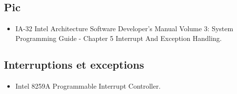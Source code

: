\documentclass[10pt,a4wide]{article}
\begin{document}
\subsection{Pic}

\paragraph{}

\begin{itemize}
\item IA-32 Intel Architecture Software Developer's Manual Volume 3:
      System Programming Guide - Chapter 5 Interrupt And Exception Handling.
\end{itemize}

\subsection{Interruptions et exceptions}

\paragraph{}

\begin{itemize}
\item Intel 8259A Programmable Interrupt Controller.
\end{itemize}
\end{document}
